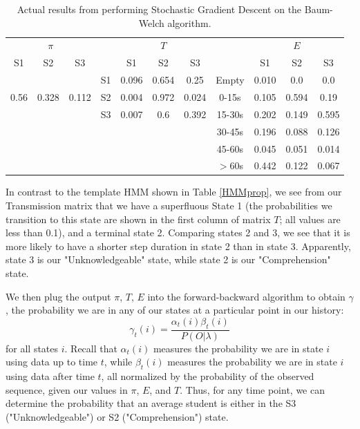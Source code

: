 \documentclass{article} %
\begin{document}
\begin{table}[t]
\begin{center}
\begin{tabular}{ccc|c|ccc|c|ccc}
\multicolumn{3}{c}{$\pi$} && \multicolumn{3}{c}{$T$} && \multicolumn{3}{c}{$E$}\\
S1 & S2 & S3 & & S1 & S2 & S3 && S1 & S2 & S3\\
& & & S1 & 0.096 & 0.654 & 0.25  &Empty & 0.010 & 0.0 & 0.0\\
0.56 & 0.328 & 0.112 & S2 & 0.004 & 0.972 & 0.024 &0-15s& 0.105 & 0.594 & 0.19\\
&&& S3 & 0.007 & 0.6 & 0.392 &15-30s& 0.202 & 0.149 & 0.595\\
&&&&&&&30-45s & 0.196 & 0.088 & 0.126\\
&&&&&&&45-60s & 0.045 & 0.051 & 0.014\\
&&&&&&&$>$60s& 0.442 & 0.122 & 0.067\\
\end{tabular}
\caption{Actual results from performing Stochastic Gradient Descent on the Baum-Welch algorithm.}\label{HMMresults}
\end{center}
\end{table}

In contrast to the template HMM shown in Table \ref{HMMprop}, we see from our Transmission matrix that we have a superfluous State 1 (the probabilities we transition to this state are shown in the first column of matrix $T$; all values are less than 0.1), and a terminal state 2. Comparing states 2 and 3, we see that it is more likely to have a shorter step duration in state 2 than in state 3. Apparently, state 3 is our "Unknowledgeable" state, while state 2 is our "Comprehension" state.

We then plug the output $\pi$, $T$, $E$ into the forward-backward algorithm to obtain $\gamma$, the probability we are in any of our states at a particular point in our history:
\begin{equation}
\gamma_t(i) = \frac{\alpha_t(i)\beta_t(i)}{P(O|\lambda)}\label{gamma}
\end{equation}
for all states $i$. Recall that $\alpha_t(i)$ measures the probability we are in state $i$ using data up to time $t$, while $\beta_t(i)$ measures the probability we are in state $i$ using data after time $t$, all normalized by the probability of the observed sequence, given our values in $\pi$, $E$, and $T$. Thus, for any time point, we can determine the probability that an average student is either in the S3 ("Unknowledgeable") or S2 ("Comprehension") state.
\end{document}
